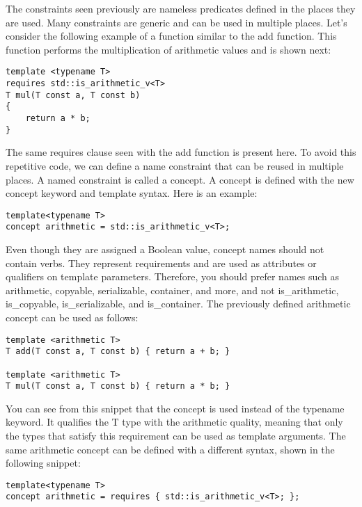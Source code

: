 The constraints seen previously are nameless predicates defined in the places they are used. Many constraints are generic and can be used in multiple places. Let’s consider the following example of a function similar to the add function. This function performs the multiplication of arithmetic values and is shown next:

\begin{lstlisting}[style=styleCXX]
template <typename T>
requires std::is_arithmetic_v<T>
T mul(T const a, T const b)
{
	return a * b;
}
\end{lstlisting}

The same requires clause seen with the add function is present here. To avoid this repetitive code, we can define a name constraint that can be reused in multiple places. A named constraint is called a concept. A concept is defined with the new concept keyword and template syntax. Here is an example:

\begin{lstlisting}[style=styleCXX]
template<typename T>
concept arithmetic = std::is_arithmetic_v<T>;
\end{lstlisting}

Even though they are assigned a Boolean value, concept names should not contain verbs. They represent requirements and are used as attributes or qualifiers on template parameters. Therefore, you should prefer names such as arithmetic, copyable, serializable, container, and more, and not is\_arithmetic, is\_copyable, is\_serializable, and is\_container. The previously defined arithmetic concept can be used as follows:

\begin{lstlisting}[style=styleCXX]
template <arithmetic T>
T add(T const a, T const b) { return a + b; }

template <arithmetic T>
T mul(T const a, T const b) { return a * b; }
\end{lstlisting}

You can see from this snippet that the concept is used instead of the typename keyword. It qualifies the T type with the arithmetic quality, meaning that only the types that satisfy this requirement can be used as template arguments. The same arithmetic concept can be defined with a different syntax, shown in the following snippet:

\begin{lstlisting}[style=styleCXX]
template<typename T>
concept arithmetic = requires { std::is_arithmetic_v<T>; };
\end{lstlisting}

